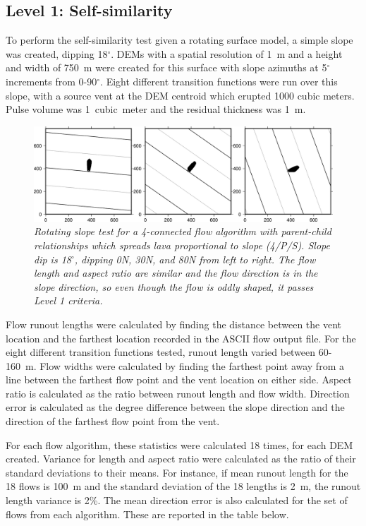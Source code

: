\documentclass[12pt,letter]{article}
\begin{document}
	\subsection{Level 1: Self-similarity}
	To perform the self-similarity test given a rotating surface model, a simple slope was created, dipping 18$^{\circ}$. DEMs with a spatial resolution of 1~m and a height and width of 750~m were created for this surface with slope azimuths at 5$^{\circ}$ increments from 0-90$^{\circ}$. Eight different transition functions were run over this slope, with a source vent at the DEM centroid which erupted 1000 cubic meters. Pulse volume was 1~cubic~meter and the residual thickness was 1~m.
	
	\begin{figure}[h!]
		\centering
		\includegraphics[width=\linewidth]{figures/lava_C_4N_slope}
		\caption{\textit{Rotating slope test for a 4-connected flow algorithm with parent-child relationships which spreads lava proportional to slope (4/P/S). Slope dip is 18$^{\circ}$, dipping 0N, 30N, and 80N from left to right. The flow length and aspect ratio are similar and the flow direction is in the slope direction, so even though the flow is oddly shaped, it passes Level 1 criteria.}}
		\label{fig:slope}
	\end{figure}
	
	Flow runout lengths were calculated by finding the distance between the vent location and the farthest location recorded in the ASCII flow output file. For the eight different transition functions tested, runout length varied between 60-160~m. Flow widths were calculated by finding the farthest point away from a line between the farthest flow point and the vent location on either side. Aspect ratio is calculated as the ratio between runout length and flow width. Direction error is calculated as the degree difference between the slope direction and the direction of the farthest flow point from the vent.
	
	For each flow algorithm, these statistics were calculated 18 times, for each DEM created. Variance for length and aspect ratio were calculated as the ratio of their standard deviations to their means. For instance, if mean runout length for the 18 flows is 100~m and the standard deviation of the 18 lengths is 2~m, the runout length variance is 2\%. The mean direction error is also calculated for the set of flows from each algorithm. These are reported in the table below.
\end{document}

